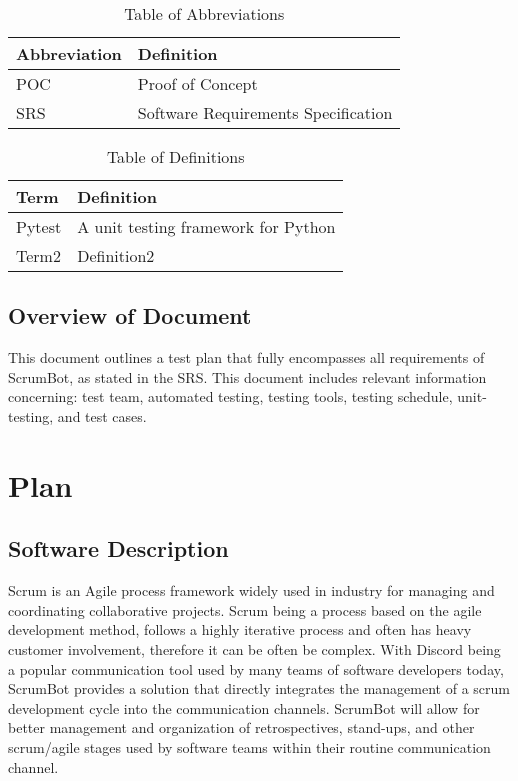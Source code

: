 \documentclass[12pt, titlepage]{article}
\begin{document}
\begin{table}[hbp]
    \caption{Table of Abbreviations}
    \label{Table}
    \begin{tabularx}{\textwidth}{p{3cm}X}
        \toprule
        \textbf{Abbreviation} & \textbf{Definition} \\
        \midrule
        POC & Proof of Concept\\
        SRS & Software Requirements Specification\\
        \bottomrule
    \end{tabularx}
\end{table}

\begin{table}[!htbp]
    \caption{Table of Definitions}
    \label{Table}
    \begin{tabularx}{\textwidth}{p{3cm}X}
        \toprule
        \textbf{Term} & \textbf{Definition}\\
        \midrule
        Pytest & A unit testing framework for Python\\
        Term2 & Definition2\\
        \bottomrule
    \end{tabularx}
\end{table} 

\subsection{Overview of Document}
This document outlines a test plan that fully encompasses all requirements of ScrumBot, as stated in the SRS. This document includes relevant information concerning: test team, automated testing, testing tools, testing schedule, unit-testing, and test cases.

\section{Plan}
\subsection{Software Description}
Scrum is an Agile process framework widely used in industry for managing and coordinating collaborative projects. Scrum being a process based on the agile development method, follows a highly iterative process and often has heavy customer involvement, therefore it can be often be complex. With Discord being a popular communication tool used by many teams of software developers today, ScrumBot provides a solution that directly integrates the management of a scrum development cycle into the communication channels. ScrumBot will allow for better management and organization of retrospectives, stand-ups, and other scrum/agile stages used by software teams within their routine communication channel.
\end{document}
